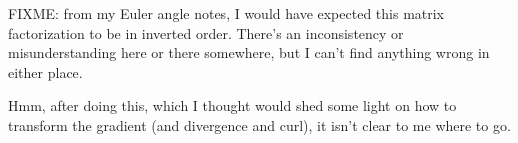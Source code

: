\documentclass{article}
\begin{document}
FIXME: from my Euler angle notes, I would have expected this matrix factorization to be in inverted order.  There's an inconsistency
or misunderstanding here or there somewhere, but I can't find anything wrong in either place.

Hmm, after doing this, which I thought would shed some light on how to transform the gradient (and divergence and curl), it isn't clear to me
where to go.



\end{document}
